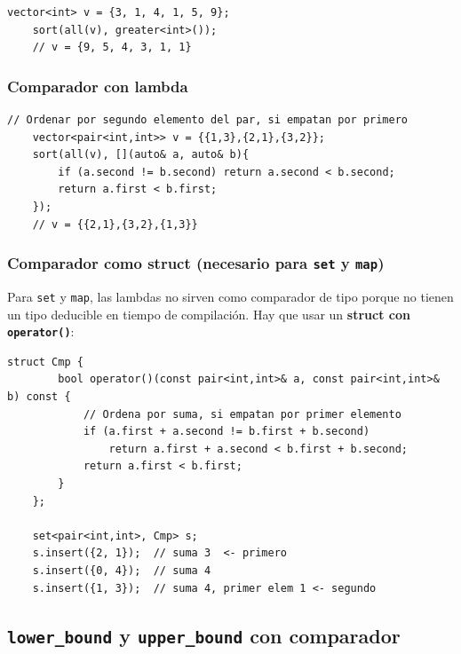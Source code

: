 \begin{lstlisting}[style=cppstyle, caption={Ordenar de mayor a menor}]
    vector<int> v = {3, 1, 4, 1, 5, 9};
    sort(all(v), greater<int>());
    // v = {9, 5, 4, 3, 1, 1}
\end{lstlisting}

\subsubsection{Comparador con lambda}

\begin{lstlisting}[style=cppstyle, caption={Ordenar con lambda personalizada}]
    // Ordenar por segundo elemento del par, si empatan por primero
    vector<pair<int,int>> v = {{1,3},{2,1},{3,2}};
    sort(all(v), [](auto& a, auto& b){
        if (a.second != b.second) return a.second < b.second;
        return a.first < b.first;
    });
    // v = {{2,1},{3,2},{1,3}}
\end{lstlisting}

\subsubsection{Comparador como struct (necesario para \texttt{set} y \texttt{map})}

Para \texttt{set} y \texttt{map}, las lambdas no sirven como comparador de tipo porque no tienen un tipo deducible en tiempo de compilación. Hay que usar un \textbf{struct con \texttt{operator()}}:

\begin{lstlisting}[style=cppstyle, caption={Struct comparador para set}]
    struct Cmp {
        bool operator()(const pair<int,int>& a, const pair<int,int>& b) const {
            // Ordena por suma, si empatan por primer elemento
            if (a.first + a.second != b.first + b.second)
                return a.first + a.second < b.first + b.second;
            return a.first < b.first;
        }
    };

    set<pair<int,int>, Cmp> s;
    s.insert({2, 1});  // suma 3  <- primero
    s.insert({0, 4});  // suma 4
    s.insert({1, 3});  // suma 4, primer elem 1 <- segundo
\end{lstlisting}

\subsection{\texttt{lower\_bound} y \texttt{upper\_bound} con comparador}

